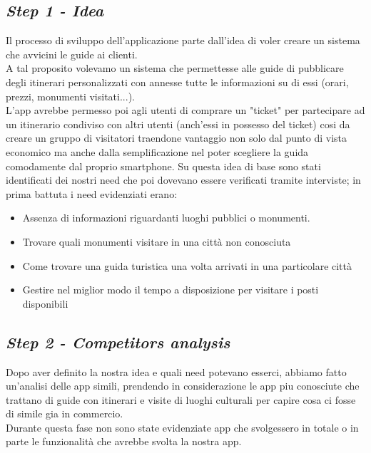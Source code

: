 \subsection{\emph{Step 1 - Idea}}
Il processo di sviluppo dell'applicazione parte dall'idea di voler creare un sistema che avvicini le guide ai clienti.\\
A tal proposito volevamo un sistema che permettesse alle guide di pubblicare degli itinerari personalizzati con annesse tutte le informazioni su di essi (orari, prezzi, monumenti visitati...).\\
L'app avrebbe permesso poi agli utenti di comprare un "ticket" per partecipare ad un itinerario condiviso con altri utenti (anch'essi in possesso del ticket) cosi da creare un gruppo di visitatori traendone vantaggio non solo dal punto di vista economico ma anche dalla semplificazione nel poter scegliere la guida comodamente dal proprio smartphone.
Su questa idea di base sono stati identificati dei nostri need che poi dovevano essere verificati tramite interviste; in prima battuta i need evidenziati erano:
\begin{itemize}
	\item Assenza di informazioni riguardanti luoghi pubblici o monumenti.
	\item Trovare quali monumenti visitare in una città non conosciuta
	\item Come trovare una guida turistica una volta arrivati in una particolare città
	\item Gestire nel miglior modo il tempo a disposizione per visitare i posti disponibili
\end{itemize}
\subsection{\emph{Step 2 - Competitors analysis}} %
Dopo aver definito la nostra idea e quali need potevano esserci, abbiamo fatto un'analisi delle app simili, prendendo in considerazione le app piu conosciute che trattano di guide con itinerari e visite di luoghi culturali per capire cosa ci fosse di simile gia in commercio.\\
Durante questa fase non sono state evidenziate app che svolgessero in totale o in parte le funzionalità che avrebbe svolta la nostra app.
